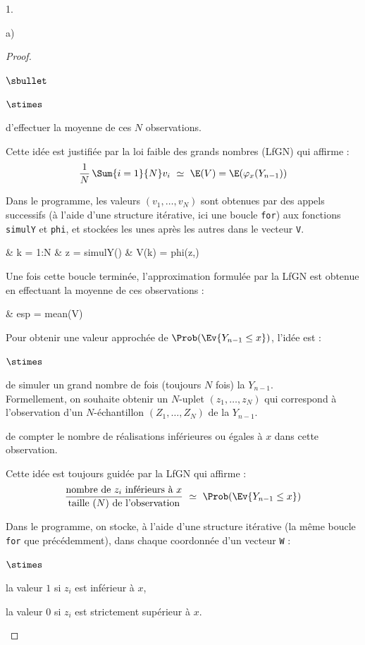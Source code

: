 \documentclass[11pt]{article}%
\begin{document}
\begin{noliste}{1.}
\begin{noliste}{a)}
\begin{proof}
\begin{noliste}{$\sbullet$}
\begin{noliste}{$\stimes$}
	  \item d'effectuer la moyenne de ces $N$ observations.
	\end{noliste}
	Cette idée est justifiée par la loi faible des grands 
	nombres (LfGN) qui affirme : 
	\[
	  \dfrac{1}{N} \, \Sum{i=1}{N} v_i \ \simeq \ \E(V)  = 
	  \E(\varphi_x(Y_{n-1}))
	\]
	
	\item Dans le programme, les valeurs $(v_1, \ldots, v_N)$ 
	sont obtenues par des appels successifs (à l'aide d'une 
	structure itérative, ici une boucle {\tt for}) aux
	fonctions {\tt simulY} et {\tt phi}, et stockées les 
	unes après les autres dans le vecteur {\tt V}.
	\begin{scilabC}{4}
	  & \quad {} k = 1:N \nl %
	  & \quad \quad z = simulY() \nl %
	  & \quad \quad V(k) = phi(z,)
	\end{scilabC}
	Une fois cette boucle terminée, l'approximation formulée par 
	la LfGN est obtenue en effectuant la moyenne de ces 
	observations :
	\begin{scilabC}{13}
	  & \quad esp = mean(V)
	\end{scilabC}
	
	\item Pour obtenir une valeur approchée de $\Prob(\Ev{Y_{n-1}
	\leq x})$, l'idée est :
	\begin{noliste}{$\stimes$}
	  \item de simuler un grand nombre de fois (toujours $N$ fois)
	  la \var $Y_{n-1}$.\\
	  Formellement, on souhaite obtenir un $N$-uplet $(z_1, 
	  \ldots, z_N)$ qui correspond à l'observation d'un 
	  $N$-échantillon $(Z_1,\ldots, Z_N)$ de la \var $Y_{n-1}$.
	  
	  \item de compter le nombre de réalisations inférieures ou
	  égales à $x$ dans cette observation.
	\end{noliste}
	Cette idée est toujours guidée par la LfGN qui affirme :
	\[
	  \dfrac{\text{nombre de $z_i$ inférieurs à $x$}}
	  {\text{taille ($N$) de l'observation}} \ \simeq \ 
	  \Prob(\Ev{Y_{n-1} \leq x})
	\]
	
	\item Dans le programme, on stocke, à l'aide d'une structure 
	itérative (la même boucle {\tt for} que précédemment),
	dans chaque coordonnée
	d'un vecteur {\tt W} :
	\begin{noliste}{$\stimes$}
	  \item la valeur $1$ si $z_i$ est inférieur à $x$,
	  \item la valeur $0$ si $z_i$ est strictement supérieur à $x$.
	\end{noliste}
	

\end{noliste}
\end{proof}
\end{noliste}
\end{noliste}
\end{document}
